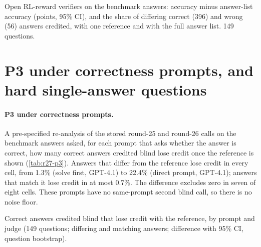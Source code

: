 \begin{table}[htbp]
\centering
\caption{Open RL-reward verifiers on the benchmark answers: accuracy minus answer-list accuracy (points, 95\% CI), and the share of differing correct (396) and wrong (56) answers credited, with one reference and with the full answer list. 149 questions.\pre}
\label{tab:r26-verifiers}
\footnotesize
\setlength{\tabcolsep}{3pt}
\begin{adjustbox}{max width=\linewidth}\end{adjustbox}
\end{table}

\FloatBarrier
\section{P3 under correctness prompts, and hard single-answer questions}
\label{app:r27}

\paragraph{P3 under correctness prompts.} A pre-specified re-analysis of the stored round-25 and round-26 calls on the benchmark answers asked, for each prompt that asks whether the answer is correct, how many correct answers credited blind lose credit once the reference is shown (\cref{tab:r27-p3}). Answers that differ from the reference lose credit in every cell, from 1.3\% (solve first, GPT-4.1) to 22.4\% (direct prompt, GPT-4.1); answers that match it lose credit in at most 0.7\%. The difference excludes zero in seven of eight cells. These prompts have no same-prompt second blind call, so there is no noise floor.

\begin{table}[htbp]
\centering
\caption{Correct answers credited blind that lose credit with the reference, by prompt and judge (149 questions; differing and matching answers; difference with 95\% CI, question bootstrap).\pre}
\label{tab:r27-p3}
\footnotesize

\end{table}


